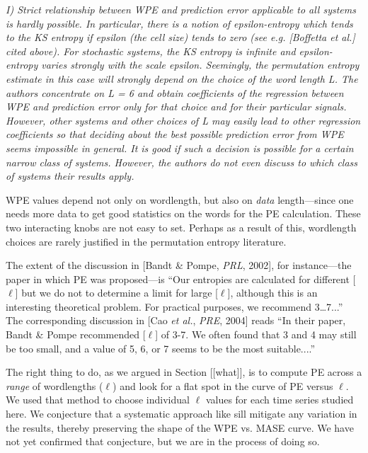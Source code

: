 \documentclass[12pt]{article}
\begin{document}
\emph{I) Strict relationship between WPE and prediction error
  applicable to all systems is hardly possible. In particular, there
  is a notion of epsilon-entropy which tends to the KS entropy if
  epsilon (the cell size) tends to zero (see e.g.  [Boffetta et al.]
  cited above). For stochastic systems, the KS entropy is infinite and
  epsilon-entropy varies strongly with the scale epsilon. Seemingly,
  the permutation entropy estimate in this case will strongly depend
  on the choice of the word length L. The authors concentrate on L = 6
  and obtain coefficients of the regression between WPE and prediction
  error only for that choice and for their particular
  signals. However, other systems and other choices of L may easily
  lead to other regression coefficients so that deciding about the
  best possible prediction error from WPE seems impossible in
  general. It is good if such a decision is possible for a certain
  narrow class of systems. However, the authors do not even discuss to
  which class of systems their results apply.}

WPE values depend not only on wordlength, but also on \emph{data}
length---since one needs more data to get good statistics on the words
for the PE calculation.  These two interacting knobs are not easy to
set.  Perhaps as a result of this, wordlength choices are rarely
justified in the permutation entropy literature.

The extent of the discussion in [Bandt \& Pompe, {\sl PRL}, 2002], for
instance---the paper in which PE was proposed---is ``Our entropies are
calculated for different [$\ell$] but we do not to determine a limit
for large [$\ell$], although this is an interesting theoretical
problem. For practical purposes, we recommend 3\dots7...''  The
corresponding discussion in [Cao {\sl et al.}, {\sl PRE}, 2004] reads
``In their paper, Bandt \& Pompe recommended [$\ell$] of 3-7.  We
often found that 3 and 4 may still be too small, and a value of 5, 6,
or 7 seems to be the most suitable....''

The right thing to do, as we argued in Section [[what]], is to compute
PE across a \emph{range} of wordlengths ($\ell$) and look for a flat
spot in the curve of PE versus $\ell$.  We used that method to choose
individual $\ell$ values for each time series studied here.  We
conjecture that a systematic approach like sill mitigate any variation
in the results, thereby preserving the shape of the WPE vs. MASE
curve.  We have not yet confirmed that conjecture, but we are in the
process of doing so.
\end{document}
